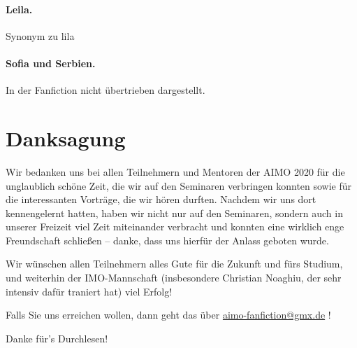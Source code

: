 \documentclass[oneside]{memoir}
\begin{document}
\paragraph{Leila.} Synonym zu lila

\paragraph{Sofia und Serbien.} In der Fanfiction nicht übertrieben dargestellt.



\newpage
\section*{Danksagung}

Wir bedanken uns bei allen Teilnehmern und Mentoren der AIMO 2020 für die unglaublich schöne Zeit, die wir auf den Seminaren verbringen konnten sowie für die interessanten Vorträge, die wir hören durften. Nachdem wir uns dort kennengelernt hatten, haben wir nicht nur auf den Seminaren, sondern auch in unserer Freizeit viel Zeit miteinander verbracht und konnten eine wirklich enge Freundschaft schließen -- danke, dass uns hierfür der Anlass geboten wurde.

\medskip
\noindent Wir wünschen allen Teilnehmern alles Gute für die Zukunft und fürs Studium, und weiterhin der IMO-Mannschaft (insbesondere Christian Noaghiu, der sehr intensiv dafür traniert hat) viel Erfolg!

\medskip
\noindent Falls Sie uns erreichen wollen, dann geht das über \url{aimo-fanfiction@gmx.de} !

\medskip
\noindent Danke für's Durchlesen!
\end{document}
